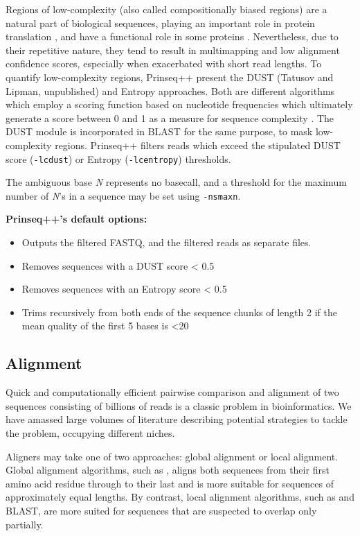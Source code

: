 Regions of low-complexity (also called compositionally biased regions) are a natural part of biological sequences, playing an important role in protein translation \citep{frugier2010low}, and have a functional role in some proteins \citep{ntountoumi2019low}. Nevertheless, due to their repetitive nature, they tend to result in multimapping and low alignment confidence scores, especially when exacerbated with short read lengths. To quantify low-complexity regions, Prinseq++ present the DUST (Tatusov and Lipman, unpublished) and Entropy approaches. Both are different algorithms which employ a scoring function based on nucleotide frequencies which ultimately generate a score between 0 and 1 as a measure for sequence complexity  \citep{morgulis2006fast}. The DUST module is incorporated in BLAST \citep{altschul1997gapped} for the same purpose, to mask low-complexity regions. Prinseq++ filters reads which exceed the stipulated DUST score (\texttt{-lc\textunderscore dust}) or Entropy (\texttt{-lc\textunderscore entropy}) thresholds.

The ambiguous base \textit{N} represents no basecall, and a threshold for the maximum number of \textit{N}'s in a sequence may be set using \texttt{-ns\textunderscore max\textunderscore n}.
    
\textbf{Prinseq++'s default options:}
\begin{itemize}\itemsep0em
\item Outputs the filtered FASTQ, and the filtered reads as separate files.
\item Removes sequences with a DUST score < 0.5
\item Removes sequences with an Entropy score < 0.5 
\item Trims recursively from both ends of the sequence chunks of length 2 if the mean quality of the first 5 bases is <20 
\end{itemize}

\subsection{Alignment}

Quick and computationally efficient pairwise comparison and alignment of two sequences consisting of billions of reads is a classic problem in bioinformatics. We have amassed large volumes of literature describing potential strategies to tackle the problem, occupying different niches.

Aligners may take one of two approaches: global alignment or local alignment. Global alignment algorithms, such as \cite{needleman1970general}, aligns both sequences from their first amino acid residue through to their last and is more suitable for sequences of approximately equal lengths. By contrast, local alignment algorithms, such as \cite{smith1981identification} and BLAST, are more suited for sequences that are suspected to overlap only partially. 

